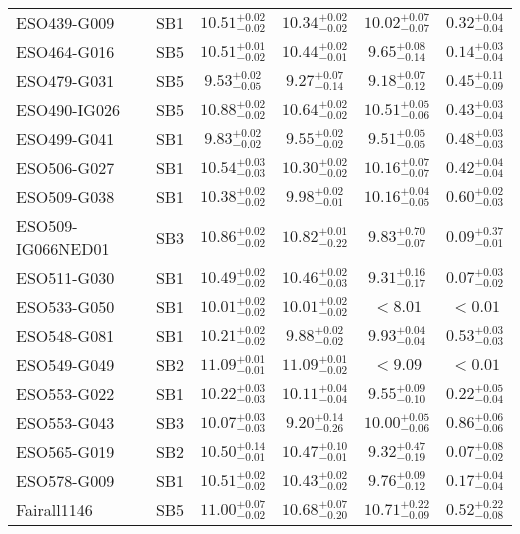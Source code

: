 \documentclass[onecolumn]{mn2e}
\begin{document}
{\begin{center}
\begin{longtable}{lccccc}
ESO439-G009 & SB1 & $10.51_{-0.02}^{+0.02}$ & $10.34_{-0.02}^{+0.02}$ & $10.02_{-0.07}^{+0.07}$ &$0.32_{-0.04}^{+0.04}$ \\
ESO464-G016 & SB5 & $10.51_{-0.02}^{+0.01}$ & $10.44_{-0.01}^{+0.02}$ & $9.65_{-0.14}^{+0.08}$ &$0.14_{-0.04}^{+0.03}$ \\
ESO479-G031 & SB5 & $9.53_{-0.05}^{+0.02}$ & $9.27_{-0.14}^{+0.07}$ & $9.18_{-0.12}^{+0.07}$ &$0.45_{-0.09}^{+0.11}$ \\
ESO490-IG026 & SB5 & $10.88_{-0.02}^{+0.02}$ & $10.64_{-0.02}^{+0.02}$ & $10.51_{-0.06}^{+0.05}$ &$0.43_{-0.04}^{+0.03}$ \\
ESO499-G041 & SB1 & $9.83_{-0.02}^{+0.02}$ & $9.55_{-0.02}^{+0.02}$ & $9.51_{-0.05}^{+0.05}$ &$0.48_{-0.03}^{+0.03}$ \\
ESO506-G027 & SB1 & $10.54_{-0.03}^{+0.03}$ & $10.30_{-0.02}^{+0.02}$ & $10.16_{-0.07}^{+0.07}$ &$0.42_{-0.04}^{+0.04}$ \\
ESO509-G038 & SB1 & $10.38_{-0.02}^{+0.02}$ & $9.98_{-0.01}^{+0.02}$ & $10.16_{-0.05}^{+0.04}$ &$0.60_{-0.03}^{+0.02}$ \\
ESO509-IG066NED01 & SB3 & $10.86_{-0.02}^{+0.02}$ & $10.82_{-0.22}^{+0.01}$ & $9.83_{-0.07}^{+0.70}$ &$0.09_{-0.01}^{+0.37}$ \\
ESO511-G030 & SB1 & $10.49_{-0.02}^{+0.02}$ & $10.46_{-0.03}^{+0.02}$ & $9.31_{-0.17}^{+0.16}$ &$0.07_{-0.02}^{+0.03}$ \\
ESO533-G050 & SB1 & $10.01_{-0.02}^{+0.02}$ & $10.01_{-0.02}^{+0.02}$ & $<8.01$ &$<0.01$ \\
ESO548-G081 & SB1 & $10.21_{-0.02}^{+0.02}$ & $9.88_{-0.02}^{+0.02}$ & $9.93_{-0.04}^{+0.04}$ &$0.53_{-0.03}^{+0.03}$ \\
ESO549-G049 & SB2 & $11.09_{-0.01}^{+0.01}$ & $11.09_{-0.02}^{+0.01}$ & $<9.09$ &$<0.01$ \\
ESO553-G022 & SB1 & $10.22_{-0.03}^{+0.03}$ & $10.11_{-0.04}^{+0.04}$ & $9.55_{-0.10}^{+0.09}$ &$0.22_{-0.04}^{+0.05}$ \\
ESO553-G043 & SB3 & $10.07_{-0.03}^{+0.03}$ & $9.20_{-0.26}^{+0.14}$ & $10.00_{-0.06}^{+0.05}$ &$0.86_{-0.06}^{+0.06}$ \\
ESO565-G019 & SB2 & $10.50_{-0.01}^{+0.14}$ & $10.47_{-0.01}^{+0.10}$ & $9.32_{-0.19}^{+0.47}$ &$0.07_{-0.02}^{+0.08}$ \\
ESO578-G009 & SB1 & $10.51_{-0.02}^{+0.02}$ & $10.43_{-0.02}^{+0.02}$ & $9.76_{-0.12}^{+0.09}$ &$0.17_{-0.04}^{+0.04}$ \\
Fairall1146 & SB5 & $11.00_{-0.02}^{+0.07}$ & $10.68_{-0.20}^{+0.07}$ & $10.71_{-0.09}^{+0.22}$ &$0.52_{-0.08}^{+0.22}$ \\

\end{longtable}
\end{center}}
\end{document}
